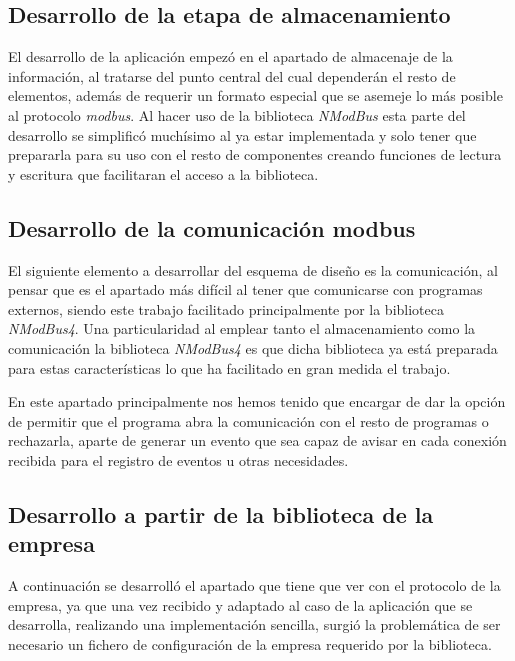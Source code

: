 \documentclass[pdftex,11pt,a4paper]{book}
\begin{document}
\subsection{Desarrollo de la etapa de almacenamiento}

El desarrollo de la aplicación empezó en el apartado de almacenaje de la información, al tratarse del punto central del cual dependerán el resto de elementos, además de requerir un formato especial que se asemeje lo más posible al protocolo \emph{modbus}. Al hacer uso de la biblioteca \emph{NModBus} esta parte del desarrollo se simplificó muchísimo al ya estar implementada y solo tener que prepararla para su uso con el resto de componentes creando funciones de lectura y escritura que facilitaran el acceso a la biblioteca.

\subsection{Desarrollo de la comunicación modbus}

El siguiente elemento a desarrollar del esquema de diseño es la comunicación, al pensar que es el apartado más difícil al tener que comunicarse con programas externos, siendo este trabajo facilitado principalmente por la biblioteca \emph{NModBus4}. Una particularidad al emplear tanto el almacenamiento como la comunicación la biblioteca \emph{NModBus4} es que dicha biblioteca ya está preparada para estas características lo que ha facilitado en gran medida el trabajo.

En este apartado principalmente nos hemos tenido que encargar de dar la opción de permitir que el programa abra la comunicación con el resto de programas o rechazarla, aparte de generar un evento que sea capaz de avisar en cada conexión recibida para el registro de eventos u otras necesidades.

\subsection{Desarrollo a partir de la biblioteca de la empresa}

A continuación se desarrolló el apartado que tiene que ver con el protocolo de la empresa, ya que una vez recibido y adaptado al caso de la aplicación que se desarrolla, realizando una implementación sencilla, surgió la problemática de ser necesario un fichero de configuración de la empresa requerido por la biblioteca.
\end{document}
